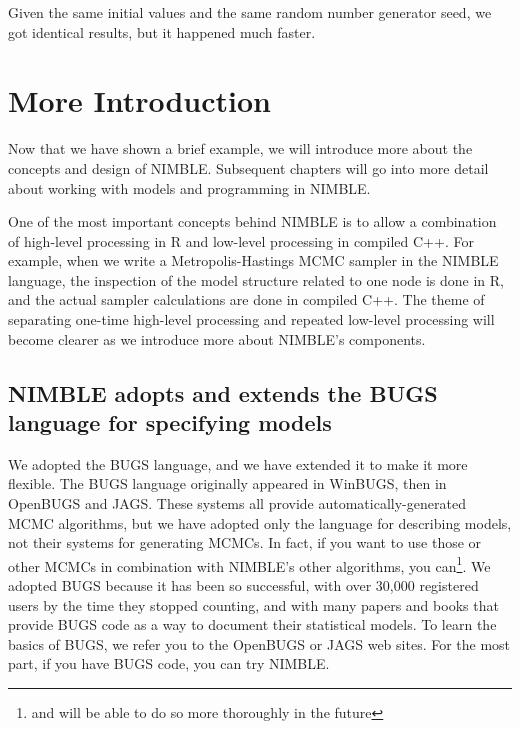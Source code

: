 \documentclass[12pt,oneside]{book}\usepackage[]{graphicx}\usepackage[]{color}
\begin{document}
Given the same initial values and the same random number generator
seed, we got identical results, but it happened much faster.





\chapter{More Introduction}

Now that we have shown a brief example, we will introduce more about
the concepts and design of NIMBLE.  Subsequent chapters will go into
more detail about working with models and programming in NIMBLE.  

One of the most important concepts behind NIMBLE is to allow a
combination of high-level processing in R and low-level processing in
compiled C++.  For example, when we write a Metropolis-Hastings MCMC
sampler in the NIMBLE language, the inspection of the model structure
related to one node is done in R, and the actual sampler calculations
are done in compiled C++.  The theme of separating one-time high-level
processing and repeated low-level processing will become clearer as we
introduce more about NIMBLE's components.


\section{NIMBLE adopts and extends the BUGS language for specifying models}

We adopted the BUGS language, and we have extended it to make it more
flexible. The BUGS language originally appeared in WinBUGS, then in
OpenBUGS and JAGS.  These systems all provide automatically-generated
MCMC algorithms, but we have adopted only the language for describing
models, not their systems for generating MCMCs. In fact, if you want
to use those or other MCMCs in combination with NIMBLE's other algorithms,
you can\footnote{and will be able to do so more thoroughly in the future}.  We adopted BUGS
because it has been so successful, with over 30,000 registered users
by the time they stopped counting, and
with many papers and books that provide BUGS code as a way to document
their statistical models. To learn the basics of BUGS, we refer you to
the OpenBUGS or JAGS web sites.  For the most part, if you have BUGS code, you can try
NIMBLE.
\end{document}
